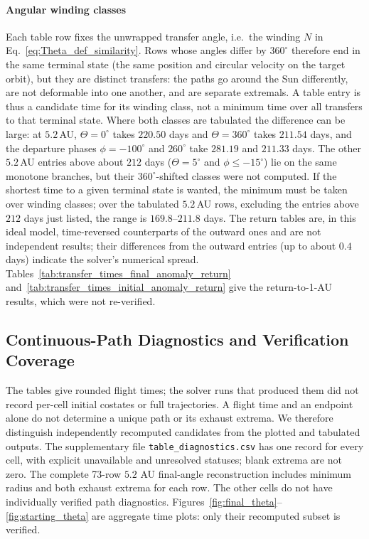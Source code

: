 \documentclass[journal,a4paper]{IEEEtran}
\begin{document}
\paragraph*{Angular winding classes}\label{sec:windings}
Each table row fixes the unwrapped transfer angle, i.e.\ the winding $N$ in Eq.~\eqref{eq:Theta_def_similarity}. Rows whose angles differ by $360^\circ$ therefore end in the same terminal state (the same position and circular velocity on the target orbit), but they are distinct transfers: the paths go around the Sun differently, are not deformable into one another, and are separate extremals. A table entry is thus a candidate time for its winding class, not a minimum time over all transfers to that terminal state. Where both classes are tabulated the difference can be large: at $5.2$\,AU, $\Theta=0^\circ$ takes $220.50$ days and $\Theta=360^\circ$ takes $211.54$ days, and the departure phases $\phi=-100^\circ$ and $260^\circ$ take $281.19$ and $211.33$ days. The other $5.2$\,AU entries above about $212$ days ($\Theta=5^\circ$ and $\phi\le-15^\circ$) lie on the same monotone branches, but their $360^\circ$-shifted classes were not computed. If the shortest time to a given terminal state is wanted, the minimum must be taken over winding classes; over the tabulated $5.2$\,AU rows, excluding the entries above $212$ days just listed, the range is $169.8$--$211.8$ days. The return tables are, in this ideal model, time-reversed counterparts of the outward ones and are not independent results; their differences from the outward entries (up to about $0.4$ days) indicate the solver's numerical spread. Tables~\ref{tab:transfer_times_final_anomaly_return} and~\ref{tab:transfer_times_initial_anomaly_return} give the return-to-1-AU results, which were not re-verified.


\subsection{Continuous-Path Diagnostics and Verification Coverage}
\label{sec:diagnostics}
The tables give rounded flight times; the solver runs that produced them
did not record per-cell initial costates or full trajectories. A flight time and an endpoint
alone do not determine a unique path or its exhaust extrema. We therefore
distinguish independently recomputed candidates from the
plotted and tabulated outputs. The supplementary file
\texttt{table\_diagnostics.csv} has one record for every cell,
with explicit unavailable and unresolved statuses; blank extrema are not
zero. The complete 73-row $5.2$ AU final-angle reconstruction includes
minimum radius and both exhaust extrema for each row. The other
cells do not have individually verified path diagnostics.
Figures~\ref{fig:final_theta}--\ref{fig:starting_theta} are aggregate time
plots: only their recomputed subset is verified.
\end{document}
